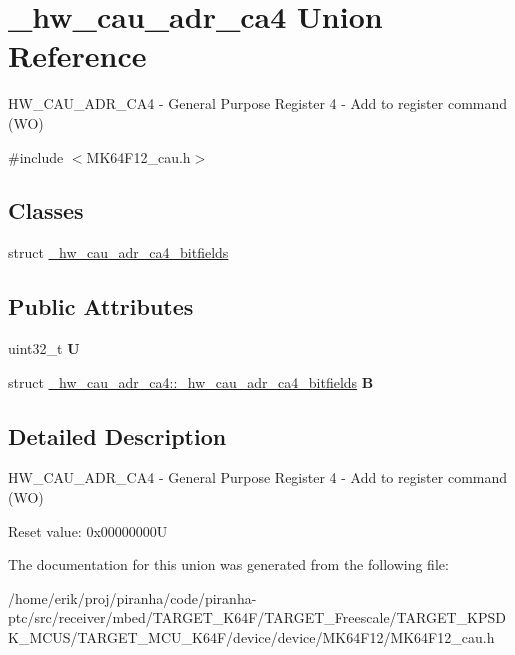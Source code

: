 \hypertarget{union__hw__cau__adr__ca4}{}\section{\+\_\+hw\+\_\+cau\+\_\+adr\+\_\+ca4 Union Reference}
\label{union__hw__cau__adr__ca4}


H\+W\+\_\+\+C\+A\+U\+\_\+\+A\+D\+R\+\_\+\+C\+A4 -\/ General Purpose Register 4 -\/ Add to register command (WO)  




{\ttfamily \#include $<$M\+K64\+F12\+\_\+cau.\+h$>$}

\subsection*{Classes}
\begin{DoxyCompactItemize}
\item 
struct \hyperlink{struct__hw__cau__adr__ca4_1_1__hw__cau__adr__ca4__bitfields}{\+\_\+hw\+\_\+cau\+\_\+adr\+\_\+ca4\+\_\+bitfields}
\end{DoxyCompactItemize}
\subsection*{Public Attributes}
\begin{DoxyCompactItemize}
\item 
uint32\+\_\+t {\bfseries U}\hypertarget{union__hw__cau__adr__ca4_ac274d147ac27a0943795587846370444}{}\label{union__hw__cau__adr__ca4_ac274d147ac27a0943795587846370444}

\item 
struct \hyperlink{struct__hw__cau__adr__ca4_1_1__hw__cau__adr__ca4__bitfields}{\+\_\+hw\+\_\+cau\+\_\+adr\+\_\+ca4\+::\+\_\+hw\+\_\+cau\+\_\+adr\+\_\+ca4\+\_\+bitfields} {\bfseries B}\hypertarget{union__hw__cau__adr__ca4_ab284b29486c3bf6722eb97e65b68373c}{}\label{union__hw__cau__adr__ca4_ab284b29486c3bf6722eb97e65b68373c}

\end{DoxyCompactItemize}


\subsection{Detailed Description}
H\+W\+\_\+\+C\+A\+U\+\_\+\+A\+D\+R\+\_\+\+C\+A4 -\/ General Purpose Register 4 -\/ Add to register command (WO) 

Reset value\+: 0x00000000U 

The documentation for this union was generated from the following file\+:\begin{DoxyCompactItemize}
\item 
/home/erik/proj/piranha/code/piranha-\/ptc/src/receiver/mbed/\+T\+A\+R\+G\+E\+T\+\_\+\+K64\+F/\+T\+A\+R\+G\+E\+T\+\_\+\+Freescale/\+T\+A\+R\+G\+E\+T\+\_\+\+K\+P\+S\+D\+K\+\_\+\+M\+C\+U\+S/\+T\+A\+R\+G\+E\+T\+\_\+\+M\+C\+U\+\_\+\+K64\+F/device/device/\+M\+K64\+F12/M\+K64\+F12\+\_\+cau.\+h\end{DoxyCompactItemize}
